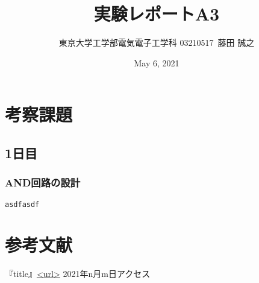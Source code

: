 \documentclass{ltjsarticle}
\title{実験レポートA3}
\author{東京大学工学部電気電子工学科 03210517\ 藤田 誠之 }
\date{May 6, 2021}
\begin{document}
\maketitle
\section{考察課題}
\subsection{1日目}
\subsubsection{AND回路の設計}

\begin{lstlisting}[caption=hoge,label=fuga]
asdfasdf
\end{lstlisting}


\section{参考文献}
『title』\url{<url>} 2021年n月m日アクセス
\end{document}
